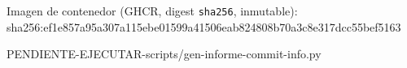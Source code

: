 \documentclass[12pt,a4paper]{article}
\providecommand{\fechaactual}{PENDIENTE-EJECUTAR-scripts/gen-informe-commit-info.py}
\begin{document}
\begin{center}
  \vspace{0.4cm}
  {\small
    Imagen de contenedor (GHCR, digest \texttt{sha256}, inmutable):\\[0.1cm]
    \ttfamily\footnotesize sha256:ef1e857a95a307a1\allowbreak15ebe01599a41506eab824808b70a3c8e317dcc55bef5163
    \par
  }

  \vfill

  {\normalsize \fechaactual \par}
\end{center}
\end{document}
